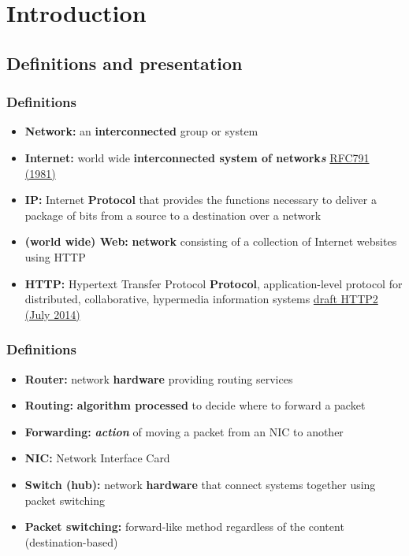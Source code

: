 \section{Introduction}
\subsection{Definitions and presentation}
  \begin{frame}
    \frametitle{Definitions}
      \begin{itemize}
        \item \textbf{Network:} an \textbf{interconnected} group or system\pause
        \item \textbf{Internet:} world wide \textbf{interconnected system of network\emph{s}} \color{blue}\href{http://tools.ietf.org/html/rfc791}{RFC791 (1981)}\color{black}\pause
        \item \textbf{IP:} Internet \textbf{Protocol} that provides the functions necessary to deliver a package of bits from a source to a destination over a network\pause
        \item \textbf{(world wide) Web:} \textbf{network} consisting of a collection of Internet websites using HTTP\pause
        \item \textbf{HTTP:} Hypertext Transfer Protocol \textbf{Protocol}, application-level protocol for distributed, collaborative, hypermedia information systems \color{blue}\href{http://tools.ietf.org/html/draft-ietf-httpbis-http2-14}{draft HTTP2 (July 2014)} \color{black}
      \end{itemize}
  \end{frame}
  \begin{frame}
    \frametitle{Definitions}
      \begin{itemize}
        \item \textbf{Router:} network \textbf{hardware} providing routing services\pause
        \item \textbf{Routing:} \textbf{algorithm processed} to decide where to forward a packet\pause
        \item \textbf{Forwarding:} \textbf{\emph{action}} of moving a packet from an NIC to another\pause
        \item \textbf{NIC:} Network Interface Card
        \item \textbf{Switch (hub):} network \textbf{hardware} that connect systems together using packet switching\pause
        \item \textbf{Packet switching:} forward-like method regardless of the content (destination-based)
      \end{itemize}
  \end{frame}
